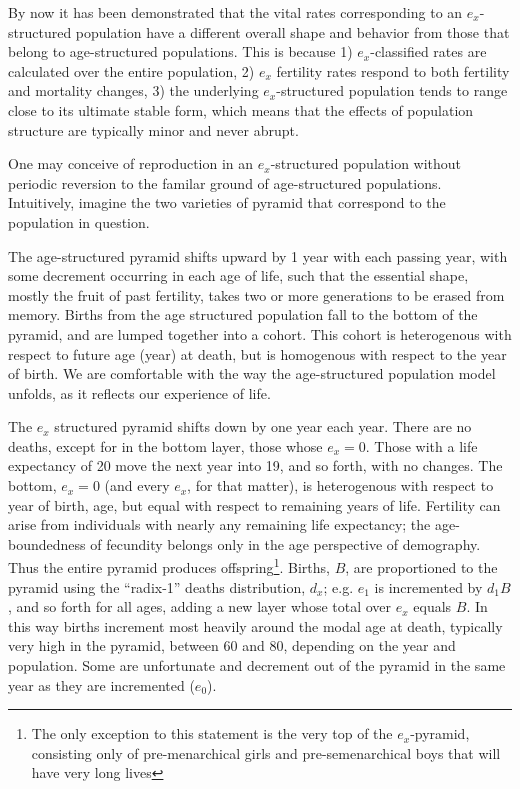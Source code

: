 
By now it has been demonstrated that the vital rates corresponding to an
$e_x$-structured population have a different overall shape and behavior from
those that belong to age-structured populations. This is because 1) $e_x$-classified rates
are calculated over the entire population, 2) $e_x$ fertility rates respond to
both fertility and mortality changes, 3) the underlying $e_x$-structured
population tends to range close to its ultimate stable form, which means that
the effects of population structure are typically minor and never abrupt.

One may conceive of reproduction in an $e_x$-structured population without
periodic reversion to the familar ground of age-structured populations.
Intuitively, imagine the two varieties of pyramid that correspond to the
population in question. 

The age-structured pyramid shifts upward by 1 year with
each passing year, with some decrement occurring in each age of life, such that
the essential shape, mostly the fruit of past fertility, takes two or more
generations to be erased from memory. Births from the age structured population
fall to the bottom of the pyramid, and are lumped together into a cohort. This
cohort is heterogenous with respect to future age (year) at death, but is
homogenous with respect to the year of birth. We are comfortable with
the way the age-structured population model unfolds, as it
reflects our experience of life.

The $e_x$ structured pyramid shifts down by one year each year. There are no
deaths, except for in the bottom layer, those whose $e_x = 0$. Those with a life
expectancy of 20 move the next year into 19, and so forth, with no changes. The
bottom, $e_x = 0$ (and every $e_x$, for that matter), is heterogenous with
respect to year of birth, age, but equal with respect to remaining years of
life. Fertility can arise from individuals with nearly any remaining life
expectancy; the age-boundedness of fecundity belongs only in the age
perspective of demography. Thus the entire pyramid produces offspring\footnote{The only exception
to this statement is the very top of the $e_x$-pyramid, consisting only of
pre-menarchical girls and pre-semenarchical boys that will have very long
lives}. Births, $B$, are proportioned to the pyramid using the ``radix-1''
deaths distribution, $d_x$; e.g. $e_1$ is incremented by $d_1 B$, and so forth for all
ages, adding a new layer whose total over $e_x$ equals $B$. In this way births
increment most heavily around the modal age at death, typically very high in the
pyramid, between 60 and 80, depending on the year and population. Some are
unfortunate and decrement out of the pyramid in the same year as they are
incremented ($e_0$).

